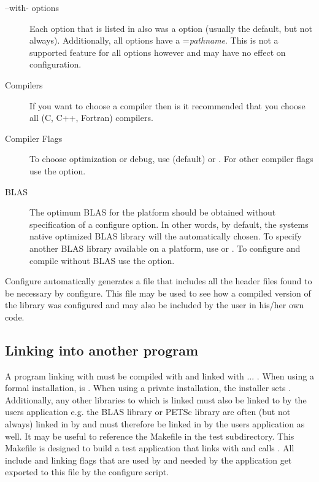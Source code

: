 \begin{description}

\item[--with- options] Each  option that is listed in
 also was a  option (usually the
default, but not always).  Additionally, all  options
have a ={\it pathname}.  This is not a
supported feature for all  options however and may have
no effect on configuration.

\item[Compilers] If you want to choose a compiler then is it recommended
that you choose all (C, C++, Fortran) compilers.

\item[Compiler Flags] To choose optimization or debug, use
 (default) or .
For other compiler flags use the  option.

\item[BLAS] The optimum BLAS for the platform should be obtained
without specification of a configure option.  In other words, by
default, the systems native optimized BLAS library will the
automatically chosen.  To specify another BLAS library available on a
platform, use  or
.  To configure and compile without
BLAS use the  option.
\end{description}

Configure automatically generates a file  that
includes all the header files found to be necessary by configure.
This file may be used to see how a compiled version of the library was
configured and may also be included by the user in his/her own code.

\subsection{Linking into another program}

A program linking with \hypre{} must be compiled with
 and linked with
... 
.
When using a formal \hypre{} installation,  is
.
When using a private installation, the installer sets
.  Additionally, any other libraries to which \hypre{}
is linked must also be linked to by the users application e.g. the
BLAS library or PETSc library are often (but not always) linked in by
\hypre{} and must therefore be linked in by the users
application as well.  It may be useful to reference the Makefile in
the test subdirectory.  This Makefile is designed to build a test
application that links with and calls \hypre{}.  All include and
linking flags that are used by \hypre{} and needed by the application
get exported to this file by the configure script.

